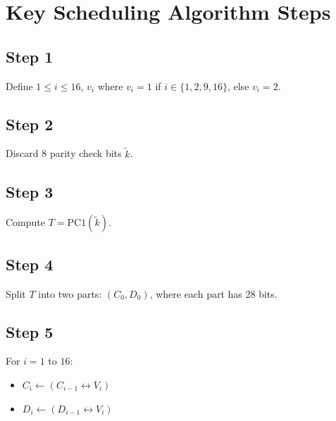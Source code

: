 \documentclass[11pt]{article}
\begin{document}
\section*{Key Scheduling Algorithm Steps}

\subsection*{Step 1}
Define $1 \leq i \leq 16$, $v_i$ where $v_i = 1$ if $i \in \{1, 2, 9, 16\}$, else $v_i = 2$.

\subsection*{Step 2}
Discard 8 parity check bits $\tilde{k}$.

\subsection*{Step 3}
Compute $T = \text{PC1}(\tilde{k})$.

\subsection*{Step 4}
Split $T$ into two parts: $(C_0, D_0)$, where each part has 28 bits.

\subsection*{Step 5}
For $i = 1$ to $16$:
\begin{itemize}
    \item $C_i \leftarrow (C_{i-1} \leftrightarrow V_i)$
    \item $D_i \leftarrow (D_{i-1} \leftrightarrow V_i)$
\end{itemize}
\end{document}
